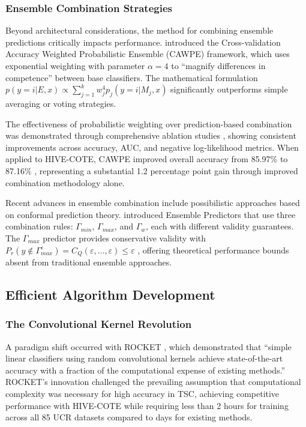 \documentclass[pdflatex,sn-basic]{sn-jnl}           %
\theoremstyle{thmstyleone}%
\theoremstyle{thmstyletwo}%
\theoremstyle{thmstylethree}%
\begin{document}
\subsubsection{Ensemble Combination Strategies}

Beyond architectural considerations, the method for combining ensemble predictions critically impacts performance. \citet[p.~3]{cawpe} introduced the Cross-validation Accuracy Weighted Probabilistic Ensemble (CAWPE) framework, which uses exponential weighting with parameter $\alpha=4$ to ``magnify differences in competence'' between base classifiers. The mathematical formulation $p(y=i|E,x) \propto \sum_{j=1}^k w_j^4 p_j(y=i|M_j,x)$ \citep[p.~8, Equation~1]{cawpe} significantly outperforms simple averaging or voting strategies.

The effectiveness of probabilistic weighting over prediction-based combination was demonstrated through comprehensive ablation studies \citep[p.~22, Figure~12]{cawpe}, showing consistent improvements across accuracy, AUC, and negative log-likelihood metrics. When applied to HIVE-COTE, CAWPE improved overall accuracy from 85.97\% to 87.16\% \citep[p.~19]{cawpe}, representing a substantial 1.2 percentage point gain through improved combination methodology alone.

Recent advances in ensemble combination include possibilistic approaches based on conformal prediction theory. \citet[p.~4]{ensemble-predictors} introduced Ensemble Predictors that use three combination rules: $\Gamma_{min}$, $\Gamma_{max}$, and $\Gamma_w$, each with different validity guarantees. The $\Gamma_{max}$ predictor provides conservative validity with $P_r(y \notin \Gamma_{max}^{\varepsilon}) = C_Q(\varepsilon,\ldots,\varepsilon) \leq \varepsilon$ \citep[Theorem~4, p.~5]{ensemble-predictors}, offering theoretical performance bounds absent from traditional ensemble approaches.

\subsection{Efficient Algorithm Development}

\subsubsection{The Convolutional Kernel Revolution}

A paradigm shift occurred with ROCKET \citep[p.~1455]{rocket}, which demonstrated that ``simple linear classifiers using random convolutional kernels achieve state-of-the-art accuracy with a fraction of the computational expense of existing methods.'' ROCKET's innovation challenged the prevailing assumption that computational complexity was necessary for high accuracy in TSC, achieving competitive performance with HIVE-COTE while requiring less than 2 hours for training across all 85 UCR datasets compared to days for existing methods.
\end{document}
